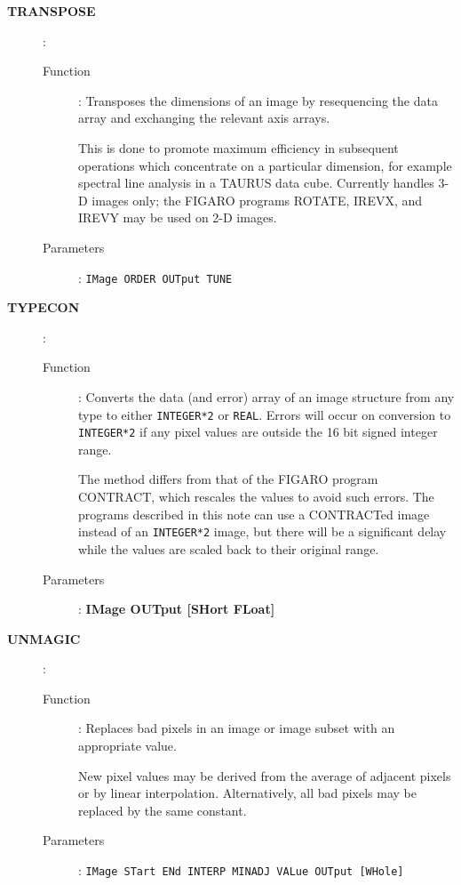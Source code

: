\begin{description}
\item[\large\bf TRANSPOSE]:
   \begin{description}
   \item[Function]:
      Transposes the dimensions of an image by resequencing the data
      array and exchanging the relevant axis arrays.

      This is done to promote maximum efficiency in subsequent
      operations which concentrate on a particular dimension, for
      example spectral line analysis in a TAURUS data cube. Currently
      handles 3-D images only; the FIGARO programs ROTATE, IREVX, and
      IREVY may be used on 2-D images.
   \item[Parameters]:
      {\tt IMage ORDER OUTput TUNE}
   \end{description}

\item[\large\bf TYPECON]:
   \begin{description}
   \item[Function]:
      Converts the data (and error) array of an image structure from
      any type to either {\tt INTEGER*2} or {\tt REAL}. Errors will
      occur on conversion to {\tt INTEGER*2} if any pixel values are
      outside the 16 bit signed integer range.

      The method differs from that of the FIGARO program CONTRACT,
      which rescales the values to avoid such errors. The programs
      described in this note can use a CONTRACTed image instead of an
      {\tt INTEGER*2} image, but there will be a significant delay
      while the values are scaled back to their original range.
   \item[Parameters]:
      {\bf IMage OUTput [SHort FLoat]}
   \end{description}

\newpage

\item[\large\bf UNMAGIC]:
   \begin{description}
   \item[Function]:
      Replaces bad pixels in an image or image subset with an
      appropriate value.

      New pixel values may be derived from the average of adjacent
      pixels or by linear interpolation.  Alternatively, all bad pixels
      may be replaced by the same constant.
   \item[Parameters]:
      {\tt IMage STart ENd INTERP MINADJ VALue OUTput [WHole]}
   \end{description}

\end{description}


